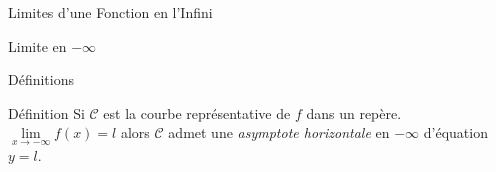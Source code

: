 \documentclass{cours}
\begin{document}
\begin{Gpartie}{Limites d'une Fonction en l'Infini}
\begin{Spartie}{Limite en $-\infty$}
\begin{SSpartie}{Définitions}
\begin{itemize}
                \end{itemize}
            \end{SSpartie}
            \begin{SSpartie}{Définition} 
                Si $\mathcal{C}$ est la courbe représentative de $f$ dans un repère. $\lim\limits_{x\to-\infty}f(x)=l$ alors $\mathcal{C}$ admet une \emph{asymptote horizontale} en $-\infty$ d'équation $y=l$.
            \end{SSpartie}
        \end{Spartie}
    \end{Gpartie}
\end{document}
